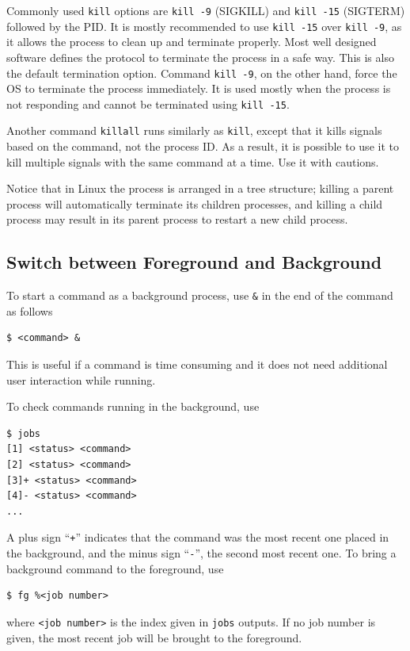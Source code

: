 Commonly used \verb|kill| options are \verb|kill -9| (SIGKILL) and \verb|kill -15| (SIGTERM) followed by the PID. It is mostly recommended to use \verb|kill -15| over \verb|kill -9|, as it allows the process to clean up and terminate properly. Most well designed software defines the protocol to terminate the process in a safe way. This is also the default termination option. Command \verb|kill -9|, on the other hand, force the OS to terminate the process immediately. It is used mostly when the process is not responding and cannot be terminated using \verb|kill -15|.

Another command \verb|killall| runs similarly as \verb|kill|, except that it kills signals based on the command, not the process ID. As a result, it is possible to use it to kill multiple signals with the same command at a time. Use it with cautions.

Notice that in Linux the process is arranged in a tree structure; killing a parent process will automatically terminate its children processes, and killing a child process may result in its parent process to restart a new child process.

\subsection{Switch between Foreground and Background}

To start a command as a background process, use \verb|&| in the end of the command as follows
\begin{lstlisting}
$ <command> &
\end{lstlisting}
This is useful if a command is time consuming and it does not need additional user interaction while running.

To check commands running in the background, use
\begin{lstlisting}
$ jobs
[1] <status> <command>
[2] <status> <command>
[3]+ <status> <command>
[4]- <status> <command>
...
\end{lstlisting}
A plus sign ``\verb|+|'' indicates that the command was the most recent one placed in the background, and the minus sign ``\verb|-|'', the second most recent one. To bring a background command to the foreground, use
\begin{lstlisting}
$ fg %<job number>
\end{lstlisting}
where \verb|<job number>| is the index given in \verb|jobs| outputs. If no job number is given, the most recent job will be brought to the foreground.

